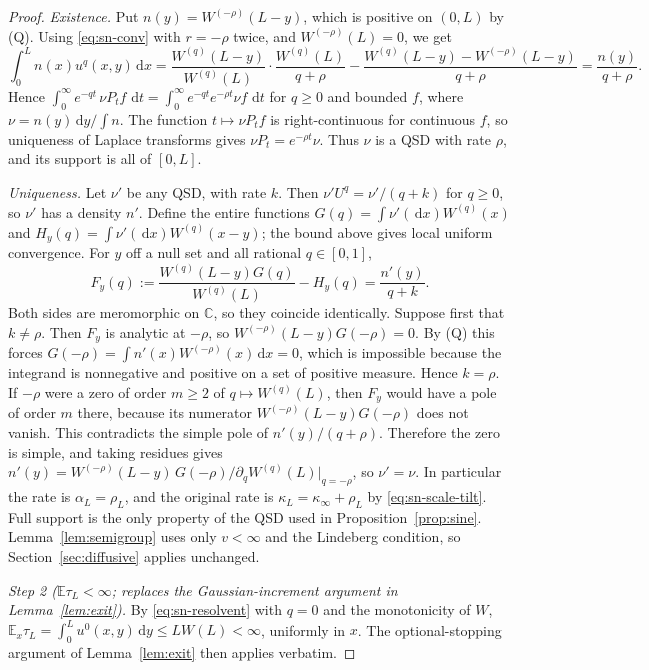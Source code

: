 \documentclass[11pt,a4paper]{article}
\theoremstyle{definition}
\theoremstyle{remark}
\newcommand{\E}{\mathbb E}
\newcommand{\1}{\mathbf 1}
\newcommand{\dd}{\,\mathrm d}
\begin{document}
\begin{proof}
\emph{Existence.} Put $n(y)=W^{(-\rho)}(L-y)$, which is positive on $(0,L)$ by (Q). Using \eqref{eq:sn-conv} with $r=-\rho$ twice, and $W^{(-\rho)}(L)=0$, we get
\[
 \int_0^Ln(x)u^q(x,y)\dd x
 =\frac{W^{(q)}(L-y)}{W^{(q)}(L)}\cdot\frac{W^{(q)}(L)}{q+\rho}
  -\frac{W^{(q)}(L-y)-W^{(-\rho)}(L-y)}{q+\rho}
 =\frac{n(y)}{q+\rho}.
\]
Hence $\int_0^\infty e^{-qt}\,\nu P_tf\,\dd t=\int_0^\infty e^{-qt}e^{-\rho t}\nu f\,\dd t$ for $q\ge0$ and bounded $f$, where $\nu=n(y)\dd y/\int n$. The function $t\mapsto\nu P_tf$ is right-continuous for continuous $f$, so uniqueness of Laplace transforms gives $\nu P_t=e^{-\rho t}\nu$. Thus $\nu$ is a QSD with rate $\rho$, and its support is all of $[0,L]$.

\emph{Uniqueness.} Let $\nu'$ be any QSD, with rate $k$. Then $\nu'U^q=\nu'/(q+k)$ for $q\ge0$, so $\nu'$ has a density $n'$. Define the entire functions $G(q)=\int\nu'(\dd x)W^{(q)}(x)$ and $H_y(q)=\int\nu'(\dd x)W^{(q)}(x-y)$; the bound above gives local uniform convergence. For $y$ off a null set and all rational $q\in[0,1]$,
\[
 F_y(q):=\frac{W^{(q)}(L-y)G(q)}{W^{(q)}(L)}-H_y(q)=\frac{n'(y)}{q+k}.
\]
Both sides are meromorphic on $\mathbb C$, so they coincide identically. Suppose first that $k\ne\rho$. Then $F_y$ is analytic at $-\rho$, so $W^{(-\rho)}(L-y)G(-\rho)=0$. By (Q) this forces $G(-\rho)=\int n'(x)W^{(-\rho)}(x)\dd x=0$, which is impossible because the integrand is nonnegative and positive on a set of positive measure. Hence $k=\rho$. If $-\rho$ were a zero of order $m\ge2$ of $q\mapsto W^{(q)}(L)$, then $F_y$ would have a pole of order $m$ there, because its numerator $W^{(-\rho)}(L-y)G(-\rho)$ does not vanish. This contradicts the simple pole of $n'(y)/(q+\rho)$. Therefore the zero is simple, and taking residues gives
$n'(y)=W^{(-\rho)}(L-y)\,G(-\rho)/\partial_qW^{(q)}(L)|_{q=-\rho}$, so $\nu'=\nu$. In particular the rate is $\alpha_L=\rho_L$, and the original rate is $\kappa_L=\kappa_\infty+\rho_L$ by \eqref{eq:sn-scale-tilt}.
Full support is the only property of the QSD used in Proposition~\ref{prop:sine}. Lemma~\ref{lem:semigroup} uses only $v<\infty$ and the Lindeberg condition, so Section~\ref{sec:diffusive} applies unchanged.

\emph{Step 2 ($\E\tau_L<\infty$; replaces the Gaussian-increment argument in Lemma~\ref{lem:exit}).}
By \eqref{eq:sn-resolvent} with $q=0$ and the monotonicity of $W$, $\E_x\tau_L=\int_0^Lu^0(x,y)\dd y\le LW(L)<\infty$, uniformly in $x$. The optional-stopping argument of Lemma~\ref{lem:exit} then applies verbatim.


\end{proof}
\end{document}
